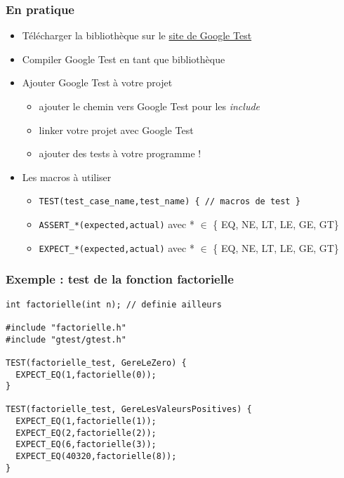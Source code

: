 \begin{frame}
\frametitle{En pratique}
\begin{itemize}
\item Télécharger la bibliothèque sur le \href{https://github.com/google/googletest}{site de Google Test}
\item Compiler Google Test en tant que bibliothèque
\item Ajouter Google Test à votre projet
\begin{itemize}
\item ajouter le chemin vers Google Test pour les \textit{include}
\item linker votre projet avec Google Test
\item ajouter des tests à votre programme !
\end{itemize}
\item Les macros à utiliser
\begin{itemize}
\item \texttt{TEST(test\_case\_name,test\_name) \{ // macros de test \} }
\item \texttt{ASSERT\_*(expected,actual)} avec * $\in$ \{ EQ, NE, LT, LE, GE, GT\}
\item \texttt{EXPECT\_*(expected,actual)} avec * $\in$ \{ EQ, NE, LT, LE, GE, GT\}
\end{itemize}
\end{itemize}
\end{frame}

\begin{frame}[fragile]
\frametitle{Exemple : test de la fonction factorielle}
\begin{lstlisting}
int factorielle(int n); // definie ailleurs

#include "factorielle.h"
#include "gtest/gtest.h"

TEST(factorielle_test, GereLeZero) {
  EXPECT_EQ(1,factorielle(0));
}

TEST(factorielle_test, GereLesValeursPositives) {
  EXPECT_EQ(1,factorielle(1));
  EXPECT_EQ(2,factorielle(2));
  EXPECT_EQ(6,factorielle(3));
  EXPECT_EQ(40320,factorielle(8));
}

\end{lstlisting}
\end{frame}

